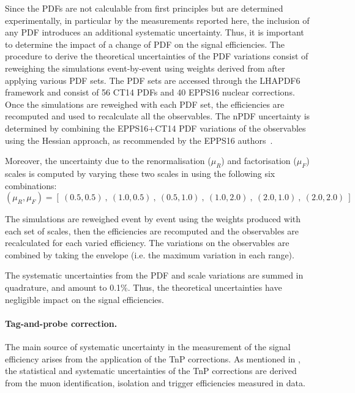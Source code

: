 Since the PDFs are not calculable from first principles but are determined experimentally, in particular by the measurements reported here, the inclusion of any PDF introduces an additional systematic uncertainty. Thus, it is important to determine the impact of a change of PDF on the signal efficiencies. The procedure to derive the theoretical uncertainties of the PDF variations consist of reweighing the simulations event-by-event using weights derived from \POWHEG after applying various PDF sets. The PDF sets are accessed through the LHAPDF6~\cite{LHAPDF6} framework and consist of 56 CT14 PDFs and 40 EPPS16 nuclear corrections. Once the simulations are reweighed with each PDF set, the efficiencies are recomputed and used to recalculate all the observables. The nPDF uncertainty is determined by combining the EPPS16+CT14 PDF variations of the observables using the Hessian approach, as recommended by the EPPS16 authors~\cite{EPPS16}. 

Moreover, the uncertainty due to the renormalisation ($\mu_{R}$) and factorisation ($\mu_{F}$) scales is computed by varying these two scales in \POWHEG using the following six combinations:
\begin{equation*}
(\mu_{R} , \mu_{F}) = [\ (0.5 , 0.5)\ ,\ (1.0 , 0.5)\ ,\ (0.5 , 1.0)\ ,\ (1.0 , 2.0)\ ,\ (2.0 , 1.0)\ ,\ (2.0 , 2.0)\ ]
\end{equation*}

The simulations are reweighed event by event using the \POWHEG weights produced with each set of scales, then the efficiencies are recomputed and the observables are recalculated for each varied efficiency. The variations on the observables are combined by taking the envelope (i.e. the maximum variation in each \etaMuCM range).

The systematic uncertainties from the PDF and scale variations are summed in quadrature, and amount to 0.1\%. Thus, the theoretical uncertainties have negligible impact on the signal efficiencies.

\paragraph{Tag-and-probe correction.} The main source of systematic uncertainty in the measurement of the signal efficiency arises from the application of the TnP corrections. As mentioned in , the statistical and systematic uncertainties of the TnP corrections are derived from the muon identification, isolation and trigger efficiencies measured in data.

